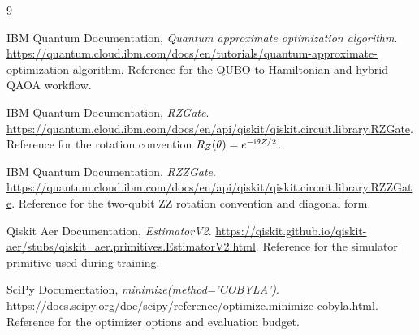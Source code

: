 \clearpage
{}
{}
\begin{thebibliography}{9}
\raggedright
{}
IBM Quantum Documentation, \emph{Quantum approximate optimization algorithm}.
\url{https://quantum.cloud.ibm.com/docs/en/tutorials/quantum-approximate-optimization-algorithm}.
Reference for the QUBO-to-Hamiltonian and hybrid QAOA workflow.

IBM Quantum Documentation, \emph{RZGate}.
\url{https://quantum.cloud.ibm.com/docs/en/api/qiskit/qiskit.circuit.library.RZGate}.
Reference for the rotation convention $R_{Z}(\theta)=e^{-\mathrm{i}\theta Z/2}$.

IBM Quantum Documentation, \emph{RZZGate}.
\url{https://quantum.cloud.ibm.com/docs/en/api/qiskit/qiskit.circuit.library.RZZGate}.
Reference for the two-qubit ZZ rotation convention and diagonal form.

Qiskit Aer Documentation, \emph{EstimatorV2}.
\url{https://qiskit.github.io/qiskit-aer/stubs/qiskit_aer.primitives.EstimatorV2.html}.
Reference for the simulator primitive used during training.

SciPy Documentation, \emph{minimize(method='COBYLA')}.
\url{https://docs.scipy.org/doc/scipy/reference/optimize.minimize-cobyla.html}.
Reference for the optimizer options and evaluation budget.
\end{thebibliography}
